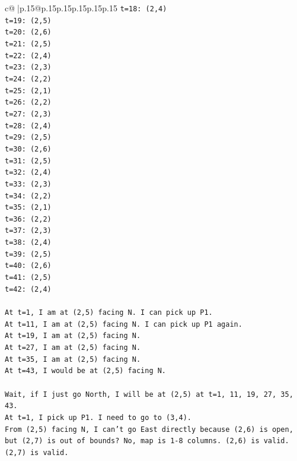 \documentclass{article}
\begin{document}
{\begin{supertabular}{c@{$\;$}|p{.15\linewidth}@{}p{.15\linewidth}p{.15\linewidth}p{.15\linewidth}p{.15\linewidth}p{.15\linewidth}}
{{{\texttt{t=18: (2,4)} \\
\texttt{t=19: (2,5)} \\
\texttt{t=20: (2,6)} \\
\texttt{t=21: (2,5)} \\
\texttt{t=22: (2,4)} \\
\texttt{t=23: (2,3)} \\
\texttt{t=24: (2,2)} \\
\texttt{t=25: (2,1)} \\
\texttt{t=26: (2,2)} \\
\texttt{t=27: (2,3)} \\
\texttt{t=28: (2,4)} \\
\texttt{t=29: (2,5)} \\
\texttt{t=30: (2,6)} \\
\texttt{t=31: (2,5)} \\
\texttt{t=32: (2,4)} \\
\texttt{t=33: (2,3)} \\
\texttt{t=34: (2,2)} \\
\texttt{t=35: (2,1)} \\
\texttt{t=36: (2,2)} \\
\texttt{t=37: (2,3)} \\
\texttt{t=38: (2,4)} \\
\texttt{t=39: (2,5)} \\
\texttt{t=40: (2,6)} \\
\texttt{t=41: (2,5)} \\
\texttt{t=42: (2,4)} \\
\\ 
\texttt{At t=1, I am at (2,5) facing N. I can pick up P1.} \\
\texttt{At t=11, I am at (2,5) facing N. I can pick up P1 again.} \\
\texttt{At t=19, I am at (2,5) facing N.} \\
\texttt{At t=27, I am at (2,5) facing N.} \\
\texttt{At t=35, I am at (2,5) facing N.} \\
\texttt{At t=43, I would be at (2,5) facing N.} \\
\\ 
\texttt{Wait, if I just go North, I will be at (2,5) at t=1, 11, 19, 27, 35, 43.} \\
\texttt{At t=1, I pick up P1. I need to go to (3,4).} \\
\texttt{From (2,5) facing N, I can't go East directly because (2,6) is open, but (2,7) is out of bounds? No, map is 1{-}8 columns. (2,6) is valid. (2,7) is valid.} \\
}}}
\end{supertabular}}
\end{document}
